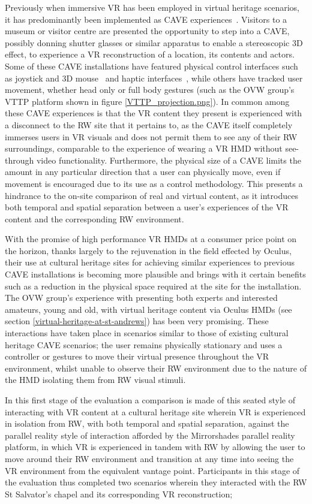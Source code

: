 Previously when immersive VR has been employed in virtual heritage scenarios, it has predominantly been implemented as CAVE experiences~\cite{Roussou2002}. Visitors to a museum or visitor centre are presented the opportunity to step into a CAVE, possibly donning shutter glasses or similar apparatus to enable a stereoscopic 3D effect, to experience a VR reconstruction of a location, its contents and actors. Some of these CAVE installations have featured physical control interfaces such as joystick and 3D mouse~\cite{cabral:x3dexperience} and haptic interfaces~\cite{Christou2006}, while others have tracked user movement, whether head only or full body  gestures (such as the OVW group's VTTP platform shown in figure \ref{VTTP_projection.png}). In common among these CAVE experiences is that the VR content they present is experienced with a disconnect to the RW site that it pertains to, as the CAVE itself completely immerses users in VR visuals and does not permit them to see any of their RW surroundings, comparable to the experience of wearing a VR HMD without see-through video functionality. Furthermore, the physical size of a CAVE limits the amount in any particular direction that a user can physically move, even if movement is encouraged due to its use as a control methodology. This presents a hindrance to the on-site comparison of real and virtual content, as it introduces both temporal and spatial separation between a user's experiences of the VR content and the corresponding RW environment.

With the promise of high performance VR HMDs at a consumer price point on the horizon, thanks largely to the rejuvenation in the field effected by Oculus, their use at cultural heritage sites for achieving similar experiences to previous CAVE installations is becoming more plausible and brings with it certain benefits such as a reduction in the physical space required at the site for the installation. The OVW group's experience with presenting both experts and interested amateurs, young and old, with virtual heritage content via Oculus HMDs (see section \ref{virtual-heritage-at-st-andrews}) has been very promising. These interactions have taken place in scenarios similar to those of existing cultural heritage CAVE scenarios; the user remains physically stationary and uses a controller or gestures to move their virtual presence throughout the VR environment, whilst unable to observe their RW environment due to the nature of the HMD isolating them from RW visual stimuli.

In this first stage of the evaluation a comparison is made of this seated style of interacting with VR content at a cultural heritage site wherein VR is experienced in isolation from RW, with both temporal and spatial separation, against the parallel reality style of interaction afforded by the Mirrorshades parallel reality platform, in which VR is experienced in tandem with RW by allowing the user to move around their RW environment and transition at any time into seeing the VR environment from the equivalent vantage point. Participants in this stage of the evaluation thus completed two scenarios wherein they interacted with the RW St Salvator's chapel and its corresponding VR reconstruction;

